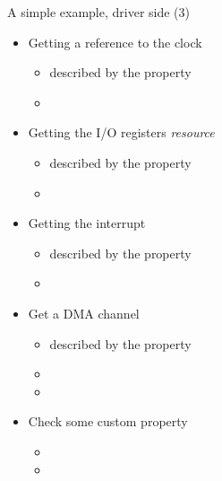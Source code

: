 \documentclass[obeyspaces,spaces,hyphens]{beamer}
\begin{document}
\begin{frame}{A simple example, driver side (3)}
  \begin{itemize}
  \item Getting a reference to the clock
    \begin{itemize}
    \item described by the  property
    \item {\scriptsize {}}
    \end{itemize}
  \item Getting the I/O registers {\em resource}
    \begin{itemize}
    \item described by the  property
    \item {\scriptsize {}}
    \end{itemize}
  \item Getting the interrupt
    \begin{itemize}
    \item described by the  property
    \item {\scriptsize {}}
    \end{itemize}
  \item Get a DMA channel
    \begin{itemize}
    \item described by the  property
    \item {\scriptsize {}}
    \item {\scriptsize {}}
    \end{itemize}
  \item Check some custom property
    \begin{itemize}
      \scriptsize
    \item {}
    \item {}
      \normalsize
    \end{itemize}
  \end{itemize}
\end{frame}
\end{document}
